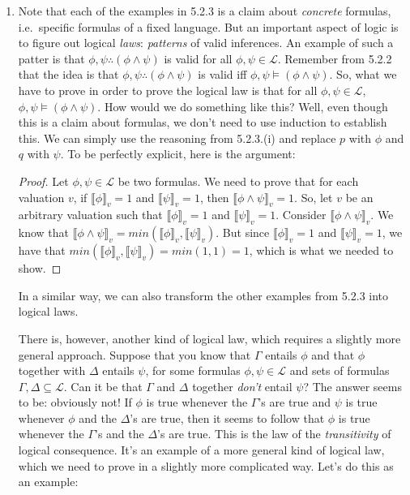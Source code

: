\begin{enumerate}[\thesection.1]
\begin{enumerate}[(i)]
\begin{proof}
			\end{proof}		
		
		\end{enumerate}
		
	  \item Note that each of the examples in 5.2.3 is a claim about \emph{concrete} formulas, i.e.\ specific formulas of a fixed language.
			But an important aspect of logic is to figure out logical \emph{laws}: \emph{patterns} of valid inferences.
			An example of such a patter is that $\phi,\psi\therefore(\phi\land\psi)$ is valid for all $\phi,\psi\in\mathcal{L}$.
			Remember from 5.2.2 that the idea is that $\phi,\psi\therefore(\phi\land\psi)$ is valid iff $\phi,\psi\vDash (\phi\land\psi)$.
			So, what we have to prove in order to prove the logical law is that for all $\phi,\psi\in\mathcal{L}$, $\phi,\psi\vDash(\phi\land\psi)$.
			How would we do something like this?
			Well, even though this is a claim about formulas, we don't need to use induction to establish this.
			We can simply use the reasoning from 5.2.3.(i) and replace $p$ with $\phi$ and $q$ with $\psi$.
			To be perfectly explicit, here is the argument:
			\begin{proof}
			  Let $\phi,\psi\in\mathcal{L}$ be two formulas.
			  We need to prove that for each valuation $v$, if $\llbracket \phi\rrbracket_v=1$ and $\llbracket \psi\rrbracket_v=1$, then $\llbracket \phi\land \psi\rrbracket_v=1$.
			  So, let $v$ be an arbitrary valuation such that $\llbracket \phi\rrbracket_v=1$ and $\llbracket \psi\rrbracket_v=1$.
			  Consider $\llbracket \phi\land \psi\rrbracket_v$.
			  We know that $\llbracket \phi\land \psi\rrbracket_v=min(\llbracket \phi\rrbracket_v, \llbracket \psi\rrbracket_v)$.
			  But since $\llbracket \phi\rrbracket_v=1$ and $\llbracket \psi\rrbracket_v=1$, we have that $min(\llbracket \phi\rrbracket_v, \llbracket \psi\rrbracket_v)=min(1,1)=1$, which is what we needed to show.
			\end{proof}
In a similar way, we can also transform the other examples from 5.2.3 into logical laws. 

There is, however, another kind of logical law, which requires a slightly more general approach. Suppose that you know that $\Gamma$ entails $\phi$ and that $\phi$ together with $\Delta$ entails $\psi$, for some formulas $\phi,\psi\in\mathcal{L}$ and sets of formulas $\Gamma,\Delta\subseteq\mathcal{L}$. Can it be that $\Gamma$ and $\Delta$ together \emph{don't} entail $\psi$? The answer seems to be: obviously not! If $\phi$ is true whenever the $\Gamma$'s are true and $\psi$ is true whenever $\phi$ and the $\Delta$'s are true, then it seems to follow that $\phi$ is true whenever the $\Gamma$'s and the $\Delta$'s are true. This is the law of the \emph{transitivity} of logical consequence. It's an example of a more general kind of logical law, which we need to prove in a slightly more complicated way. Let's do this as an example:
		

\end{enumerate}
